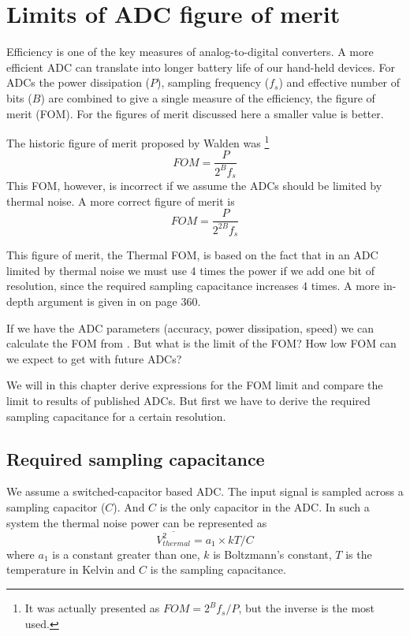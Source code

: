 \chapter{Limits of ADC figure of merit}\label{sc:limits}
Efficiency is one of the key measures of analog-to-digital
converters. A more efficient
ADC can translate into longer battery life of our
hand-held devices. For ADCs the power dissipation ($P$), sampling frequency
($f_s$) and effective number of bits ($B$) are combined to give a
single measure of the efficiency, the figure of merit (FOM). 
For the
figures of merit discussed here a smaller value is better. 

The
historic figure of merit proposed by Walden \cite{walden99}
was \footnote{It was actually presented as $FOM =2^Bf_s/P$, but the
  inverse is the most used.}
  \begin{equation}
    \label{eq:fomwalden}
    FOM = \dfrac{P}{2^{B}f_s}
  \end{equation}
This FOM, however, is incorrect if we assume the ADCs should be limited by
thermal noise. A more correct figure of merit is
  \begin{equation}
    \label{eq:fom}
    FOM = \dfrac{P}{2^{2B}f_s}
  \end{equation}

This figure of merit, the Thermal FOM, is based on the fact that in an
ADC limited by thermal noise we must use 4 times the power if we add
one bit of resolution, since the required sampling capacitance increases 4 times. A more
in-depth argument is given in \cite{schreier.uds} on page 360. 

If we have the ADC parameters (accuracy, power dissipation, speed) we
can calculate the FOM from . But
what is the limit of the FOM? How low FOM can we expect to get with
future ADCs? 

We will in this chapter derive expressions for the FOM
limit and compare the limit to results of published ADCs. But first 
we have to derive the required sampling
capacitance for a certain resolution.


\section{Required sampling capacitance}
We assume a switched-capacitor based ADC. The input signal is sampled
across a sampling capacitor ($C$). And $C$ is the only capacitor in
the ADC. In such a system the thermal noise
power can be represented as
\begin{equation}
\label{eq:thermal}
\overline{V_{thermal}^2} = a_1\times k T/C  
\end{equation}
where $a_1$ is a constant greater than one, $k$ is Boltzmann's constant, $T$ is the temperature
in Kelvin and $C$ is the sampling capacitance.

